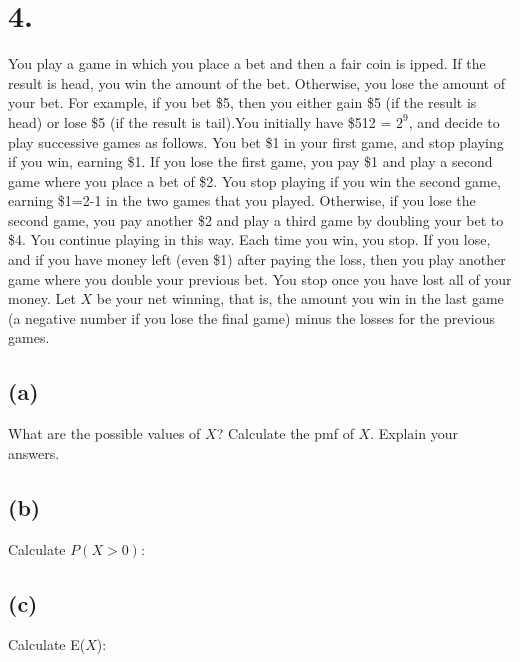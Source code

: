 \documentclass{article}
\begin{document}
\section*{4.}
{\Large 
You play a game in which you place a bet and then a fair coin is 
ipped. If the result is head, you win the
amount of the bet. Otherwise, you lose the amount of your bet. For example, if you bet \$5, then you either
gain \$5 (if the result is head) or lose \$5 (if the result is tail).You initially have \$512 = $2^9$,
and decide to play successive games as follows. You bet \$1 in your first game, and stop playing if you win,
earning \$1. If you lose the first game, you pay \$1 and play a second game where you place a bet of \$2. 
You stop playing if you win the second game, earning \$1=2-1 in the two games that you played. 
Otherwise, if you lose the second game, you pay another \$2 and play a third game by doubling your bet to \$4. 
You continue playing in this way. Each time you win, you stop. If you lose, and if you have money left 
(even \$1) after paying the loss, then you play another game where you double your previous bet.
You stop once you have lost all of your money. Let $X$ be your net winning, that is, the amount you win in the
last game (a negative number if you lose the final game) minus the losses for the previous games.

\subsection*{(a)}
What are the possible values of $X$? Calculate the pmf of $X$. Explain your answers.

\subsection*{(b)}
Calculate $P(X > 0)$:

\subsection*{(c)}
Calculate E($X$):

}
\end{document}
